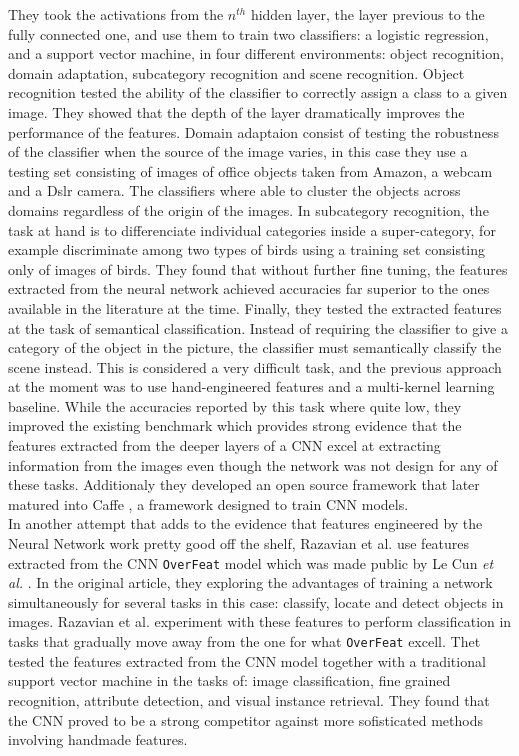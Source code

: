They took the activations from the $n^{th}$ hidden layer, the layer previous to the fully connected one, and use them to train two classifiers: a logistic regression, and a support vector machine, in four different environments: object recognition, domain adaptation, subcategory recognition and scene recognition. Object recognition tested the ability of the classifier to correctly assign a class to a given image. They showed that the depth of the layer dramatically improves the performance of the features. Domain adaptaion consist of testing the robustness of the classifier when the source of the image varies, in this case they use a testing set consisting of images of office objects taken from Amazon, a webcam and a Dslr camera. The classifiers where able to cluster the objects across domains regardless of the origin of the images. In subcategory recognition, the task at hand is to differenciate individual categories inside a super-category, for example discriminate among two types of birds using a training set consisting only of images of birds. They found that without further fine tuning, the features extracted from the neural network achieved accuracies far superior to the ones available in the literature at the time. Finally, they tested the extracted features at the task of semantical classification. Instead of requiring the classifier to give a category of the object in the picture, the classifier must semantically classify the scene instead. This is considered a very difficult task, and the previous approach at the moment was to use hand-engineered features and a multi-kernel learning baseline. While the accuracies reported by this task where quite low, they improved the existing benchmark which provides strong evidence that the features extracted from the deeper layers of a CNN excel at extracting information from the images even though the network was not design for any of these tasks. Additionaly they developed an open source framework that later matured into Caffe \cite{jia2014caffe}, a framework designed to train CNN models.\\





In another attempt that adds to the evidence that features engineered by the Neural Network work pretty good off the shelf, Razavian {et al.} \cite{DBLP:journals/corr/RazavianASC14} use features extracted from the CNN \texttt{OverFeat} model which was made public by Le Cun \textit{et al.} \cite{DBLP:journals/corr/SermanetEZMFL13}. In the original article, they exploring the advantages of training a network simultaneously for several tasks in this case: classify, locate and detect objects in images. Razavian {et al.} experiment with these features to perform classification in tasks that gradually move away from the one for what \texttt{OverFeat} excell. Thet tested the features extracted from the CNN model together with a traditional support vector machine in the tasks of: image classification, fine grained recognition, attribute detection, and visual instance retrieval. They found that the CNN proved to be a strong competitor against more sofisticated methods involving handmade features.\\

